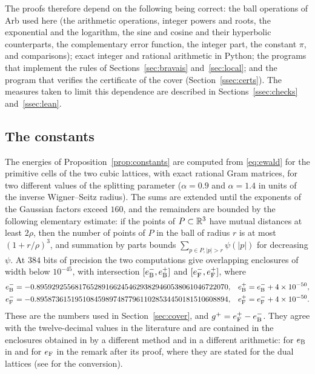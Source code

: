 The proofs therefore depend on the following being correct: the ball operations of Arb used here (the arithmetic operations,
integer powers and roots, the exponential and the logarithm, the sine and cosine and their hyperbolic counterparts, the
complementary error function, the integer part, the constant $\pi$, and comparisons); exact integer and rational arithmetic in
Python; the programs that implement the rules of Sections~\ref{sec:bravais} and~\ref{sec:local}; and the program that verifies
the certificate of the cover (Section~\ref{ssec:certs}). The measures taken to limit this dependence are described in
Sections~\ref{ssec:checks} and~\ref{ssec:lean}.

\subsection{The constants}\label{ssec:constcert}

The energies of Proposition~\ref{prop:constants} are computed from \eqref{eq:ewald} for the primitive cells of the two cubic lattices,
with exact rational Gram matrices, for two different values of the splitting parameter ($\alpha=0.9$ and $\alpha=1.4$ in units of the
inverse Wigner--Seitz radius). The sums are extended until the exponents of the Gaussian factors exceed $160$, and the remainders are
bounded by the following elementary estimate: if the points of $P\subset\mathbb R^3$ have mutual distances at least $2\rho$, then the number
of points of $P$ in the ball of radius $r$ is at most $(1+r/\rho)^3$, and summation by parts bounds $\sum_{p\in P,|p|>r}\psi(|p|)$ for
decreasing $\psi$. At $384$ bits of precision the two computations give overlapping enclosures of width below $10^{-45}$, with
intersection $[e_{\mathrm B}^-,e_{\mathrm B}^+]$ and $[e_{\mathrm F}^-,e_{\mathrm F}^+]$, where
\begin{align*}
  e_{\mathrm B}^-&=-0.89592925568176528916624546293829460538061046722070, & e_{\mathrm B}^+&=e_{\mathrm B}^-+4\times10^{-50},\\
  e_{\mathrm F}^-&=-0.89587361519510845989748779611028534450181510608894, & e_{\mathrm F}^+&=e_{\mathrm F}^-+4\times10^{-50}.
\end{align*}
These are the numbers used in Section~\ref{sec:cover}, and $g^+=e_{\mathrm F}^+-e_{\mathrm B}^-$. They agree with the twelve-decimal values in the
literature \cite{BaikoPotekhinYakovlev2001} and are contained in the enclosures obtained in \cite{MuratovNovaga2026} by a different
method and in a different arithmetic: for $e_{\mathrm B}$ in \cite[Lemma~2]{MuratovNovaga2026} and for $e_{\mathrm F}$ in the remark after its proof,
where they are stated for the dual lattices (see \cite[(7), (17), (18)]{MuratovNovaga2026} for the conversion).

